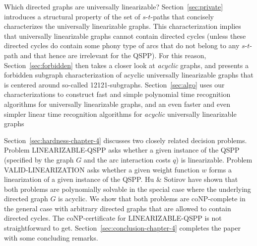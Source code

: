 Which directed graphs are universally linearizable?
Section~\ref{sec:private} introduces a structural property of the set of $s$-$t$-paths that
concisely characterizes the universally linearizable graphs.
This characterization implies that universally linearizable graphs cannot contain directed cycles
(unless these directed cycles do contain some phony type of arcs that do not belong to 
any $s$-$t$-path and that hence are irrelevant for the QSPP).
For this reason, Section~\ref{sec:forbidden} then takes a closer look at \emph{acyclic} graphs, 
and presents a forbidden subgraph characterization of acyclic universally linearizable graphs 
that is centered around so-called 12121-subgraphs.
Section~\ref{sec:algo} uses our characterizations to construct fast and simple polynomial time 
recognition algorithms for universally linearizable graphs, and an even faster and even simpler
linear time recognition algorithms for \emph{acyclic} universally linearizable graphs

Section~\ref{sec:hardness-chapter-4} discusses two closely related decision problems.
Problem LINEARIZABLE-QSPP asks whether a given instance of the QSPP (specified by the 
graph $G$ and the arc interaction costs $q$) is linearizable.
Problem VALID-LINEARIZATION asks whether a given weight function $w$ forms a linearization
of a given instance of the QSPP. 
Hu \& Sotirov \cite{huSo2021} have shown that both problems are polynomially solvable 
in the special case where the underlying directed graph $G$ is acyclic.
We show that both problems are coNP-complete in the general case with arbitrary directed 
graphs that are allowed to contain directed cycles.
The coNP-certificate for LINEARIZABLE-QSPP is not straightforward to get.
Section~\ref{sec:conclusion-chapter-4} completes the paper with some concluding remarks.


\medskip
